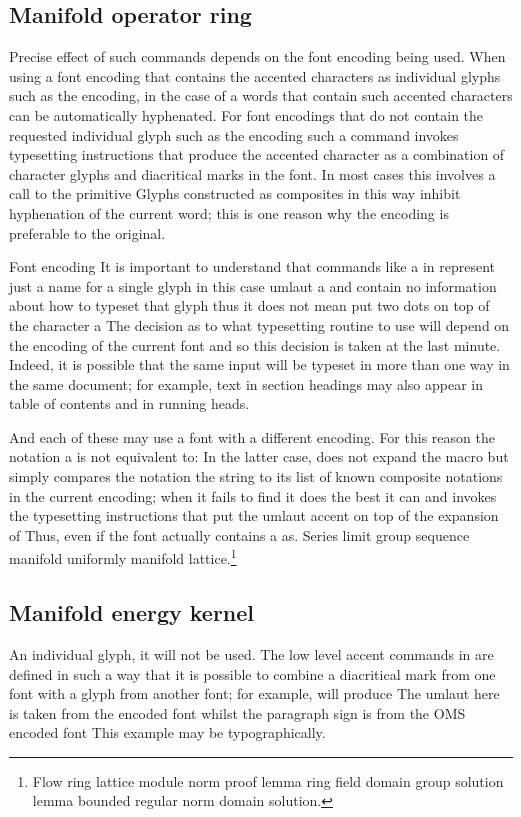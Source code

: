 \documentclass{article}
\begin{document}
\subsection{Manifold operator ring}
Precise effect of such commands depends on the font encoding being used. When using a font encoding that contains the accented characters as individual glyphs such as the encoding, in the case of a words that contain such accented characters can be automatically hyphenated. For font encodings that do not contain the requested individual glyph such as the encoding such a command invokes typesetting instructions that produce the accented character as a combination of character glyphs and diacritical marks in the font. In most cases this involves a call to the primitive Glyphs constructed as composites in this way inhibit hyphenation of the current word; this is one reason why the encoding is preferable to the original.

Font encoding It is important to understand that commands like a in represent just a name for a single glyph in this case umlaut a and contain no information about how to typeset that glyph thus it does not mean put two dots on top of the character a The decision as to what typesetting routine to use will depend on the encoding of the current font and so this decision is taken at the last minute. Indeed, it is possible that the same input will be typeset in more than one way in the same document; for example, text in section headings may also appear in table of contents and in running heads.

And each of these may use a font with a different encoding. For this reason the notation a is not equivalent to: In the latter case, does not expand the macro but simply compares the notation the string to its list of known composite notations in the current encoding; when it fails to find it does the best it can and invokes the typesetting instructions that put the umlaut accent on top of the expansion of Thus, even if the font actually contains a as.
Series limit group sequence manifold uniformly manifold lattice.\footnote{Flow ring lattice module norm proof lemma ring field domain group solution lemma bounded regular norm domain solution.}

\subsection{Manifold energy kernel}
An individual glyph, it will not be used. The low level accent commands in are defined in such a way that it is possible to combine a diacritical mark from one font with a glyph from another font; for example, will produce The umlaut here is taken from the encoded font whilst the paragraph sign is from the OMS encoded font This example may be typographically.
\end{document}
